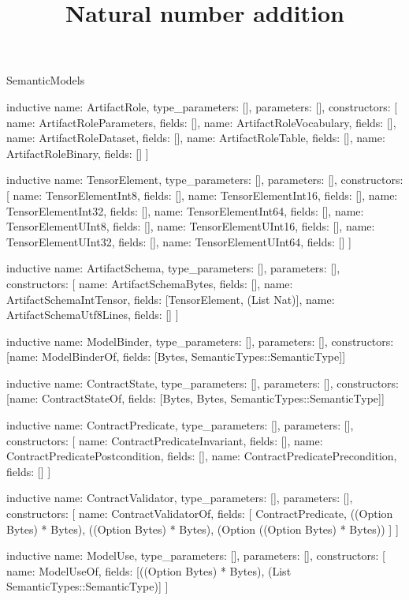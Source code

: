 \begin{lexlean}{SemanticModels}
\title{Natural number addition}
\begin{semanticmodule}
inductive{
  name: ArtifactRole,
  type_parameters: [],
  parameters: [],
  constructors: [
    {name: ArtifactRoleParameters, fields: []},
    {name: ArtifactRoleVocabulary, fields: []},
    {name: ArtifactRoleDataset, fields: []},
    {name: ArtifactRoleTable, fields: []},
    {name: ArtifactRoleBinary, fields: []}
  ]
}

inductive{
  name: TensorElement,
  type_parameters: [],
  parameters: [],
  constructors: [
    {name: TensorElementInt8, fields: []},
    {name: TensorElementInt16, fields: []},
    {name: TensorElementInt32, fields: []},
    {name: TensorElementInt64, fields: []},
    {name: TensorElementUInt8, fields: []},
    {name: TensorElementUInt16, fields: []},
    {name: TensorElementUInt32, fields: []},
    {name: TensorElementUInt64, fields: []}
  ]
}

inductive{
  name: ArtifactSchema,
  type_parameters: [],
  parameters: [],
  constructors: [
    {name: ArtifactSchemaBytes, fields: []},
    {name: ArtifactSchemaIntTensor, fields: [TensorElement, (List Nat)]},
    {name: ArtifactSchemaUtf8Lines, fields: []}
  ]
}

inductive{
  name: ModelBinder,
  type_parameters: [],
  parameters: [],
  constructors: [{name: ModelBinderOf, fields: [Bytes, SemanticTypes::SemanticType]}]
}

inductive{
  name: ContractState,
  type_parameters: [],
  parameters: [],
  constructors: [{name: ContractStateOf, fields: [Bytes, Bytes, SemanticTypes::SemanticType]}]
}

inductive{
  name: ContractPredicate,
  type_parameters: [],
  parameters: [],
  constructors: [
    {name: ContractPredicateInvariant, fields: []},
    {name: ContractPredicatePostcondition, fields: []},
    {name: ContractPredicatePrecondition, fields: []}
  ]
}

inductive{
  name: ContractValidator,
  type_parameters: [],
  parameters: [],
  constructors: [
    {
      name: ContractValidatorOf,
      fields: [
        ContractPredicate,
        ((Option Bytes) * Bytes),
        ((Option Bytes) * Bytes),
        (Option ((Option Bytes) * Bytes))
      ]
    }
  ]
}

inductive{
  name: ModelUse,
  type_parameters: [],
  parameters: [],
  constructors: [
    {name: ModelUseOf, fields: [((Option Bytes) * Bytes), (List SemanticTypes::SemanticType)]}
  ]
}


\end{semanticmodule}
\end{lexlean}
